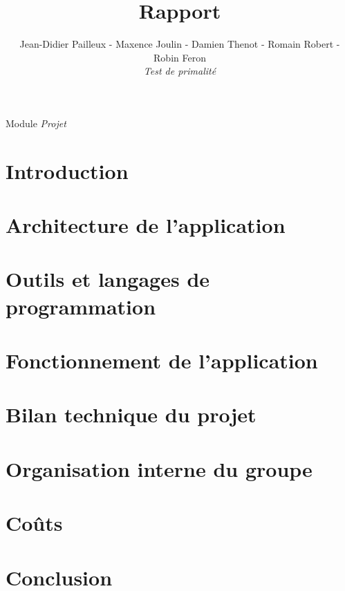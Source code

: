

\title{\vspace{\fill}\textbf{\Huge Rapport}}
\author{Jean-Didier Pailleux - Maxence Joulin - Damien Thenot - Romain Robert - Robin Feron 
	\vspace{2em}\\
	\textit{Test de primalité}
	\vspace{2em}
}


\clearpage
\maketitle\vspace{9em}
\begin{flushright}Module \textit{Projet}\end{flushright}
\newpage
\tableofcontents
\newpage\clearpage{}

	\section*{Introduction}
	
	\section{Architecture de l'application}

	\section{Outils et langages de programmation}
			
	\section{Fonctionnement de l'application}

	\section{Bilan technique du projet}
				
	\section{Organisation interne du groupe}

	\section{Coûts}

	\section*{Conclusion}



